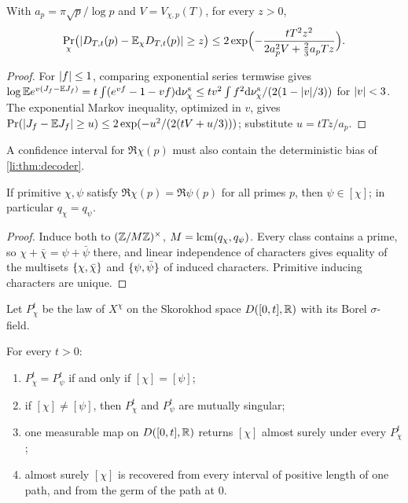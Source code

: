 \begin{proposition}\label{li:prop:confidence}
With $a_p=\pi\sqrt p/\log p$ and $V=V_{\chi,p}(T)$, for every $z>0$,
\[
 \Pr_\chi\bigl(\lvert D_{T,t}(p)-\mathbb{E}_\chi D_{T,t}(p)\rvert\ge z\bigr)\le2\exp\Bigl(-\frac{tT^2z^2}{2a_p^2V+\frac23a_pTz}\Bigr).
\]
\end{proposition}

\begin{proof}
For $\lvert f\rvert\le1$, comparing exponential series termwise gives
$\log\mathbb{E} e^{v(J_f-\mathbb{E} J_f)}=t\int(e^{vf}-1-vf)\mathrm{d}\nu^{\mathrm s}_\chi\le tv^2\int f^2\mathrm{d}\nu^{\mathrm s}_\chi/(2(1-\lvert v\rvert/3))$ for $\lvert v\rvert<3$. The
exponential Markov inequality, optimized in $v$, gives
$\Pr(\lvert J_f-\mathbb{E} J_f\rvert\ge u)\le2\exp(-u^2/(2(tV+u/3)))$; substitute $u=tTz/a_p$.
\end{proof}

A confidence interval for $\Re\chi(p)$ must also contain the deterministic bias of
\cref{li:thm:decoder}.

\begin{lemma}\label{li:lem:orbit}
If primitive $\chi,\psi$ satisfy $\Re\chi(p)=\Re\psi(p)$ for all primes $p$, then $\psi\in[\chi]$; in particular
$q_\chi=q_\psi$.
\end{lemma}

\begin{proof}
Induce both to $(\mathbb{Z}/M\mathbb{Z})^\times$, $M=\operatorname{lcm}(q_\chi,q_\psi)$. Every class contains a prime, so
$\chi+\bar\chi=\psi+\bar\psi$ there, and linear independence of characters gives equality of the multisets
$\{\chi,\bar\chi\}$ and $\{\psi,\bar\psi\}$ of induced characters. Primitive inducing characters are unique.
\end{proof}

Let $P_\chi^t$ be the law of $X^\chi$ on the Skorokhod space $D([0,t],\mathbb{R})$ with its Borel $\sigma$-field.

\begin{theorem}\label{li:thm:path}
For every $t>0$:
\begin{enumerate}[label=\textup{(\roman*)}]
\item $P_\chi^t=P_\psi^t$ if and only if $[\chi]=[\psi]$;
\item if $[\chi]\ne[\psi]$, then $P_\chi^t$ and $P_\psi^t$ are mutually singular;
\item one measurable map on $D([0,t],\mathbb{R})$ returns $[\chi]$ almost surely under every $P_\chi^t$;
\item almost surely $[\chi]$ is recovered from every interval of positive length of one path, and from
the germ of the path at $0$.
\end{enumerate}
\end{theorem}

